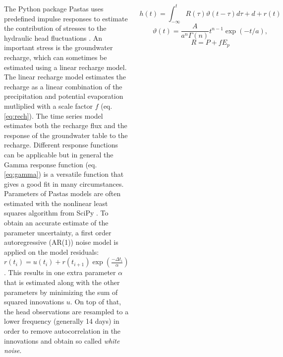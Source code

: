 \documentclass[17pt, a0paper, margin=0mm, innermargin=5mm, blockverticalspace=5mm, colspace=5mm, subcolspace=-15mm]{tikzposter}
\begin{document}
\begin{columns}
{
\vspace{-1mm}
\begin{minipage}{0.7\linewidth}
    The Python package Pastas \citep{Pastas} uses predefined impulse responses to estimate the contribution of stresses to the hydraulic head fluctuations \citep{Asmuth2002}. An important stress is the groundwater recharge, which can sometimes be estimated using a linear recharge model. The linear recharge model estimates the recharge as a linear combination of the precipitation and potential evaporation mutliplied with a scale factor $f$ (eq. \ref{eq:rech}). The time series model estimates both the recharge flux and the response of the groundwater table to the recharge. Different response functions can be applicable but in general the Gamma response function (eq. \ref{eq:gamma}) is a versatile function that gives a good fit in many circumstances. 
    Parameters of Pastas models are often estimated with the nonlinear least squares algorithm from SciPy \citep{Scipy}. To obtain an accurate estimate of the parameter uncertainty, a first order autoregressive (AR(1)) noise model is applied on the model residuals: $r(t_i) = u(t_i) + r(t_{i+1})\exp{\left(\frac{-\Delta t_i}{\alpha}\right)}$. This results in one extra parameter $\alpha$ that is estimated along with the other parameters by minimizing the sum of squared innovations $u$. On top of that, the head observations are resampled to a lower frequency (generally 14 days) in order to remove autocorrelation in the innovations and obtain so called \textit{white noise}.
\end{minipage}
\hfill
\begin{minipage}{0.3\linewidth}
    \normalsize{
    \begin{equation} \label{eq:convolution}
        h(t) = \int^t_{-\infty}R(\tau)\vartheta(t-\tau)d\tau + d + r(t)
    \end{equation}
    \vspace{2mm}
    \begin{equation} \label{eq:gamma}
        \vartheta(t) = \frac{A}{a^n\Gamma(n)} t^{n-1}\exp(-t/a),
    \end{equation}
    \vspace{2mm}
    \begin{equation} \label{eq:rech}
        R = P + f E_p
    \end{equation}
    }
    \vspace{-6mm}
    \begin{tikzfigure}\label{fig:gamma}

\end{tikzfigure}
\end{minipage}}
\end{columns}
\end{document}
